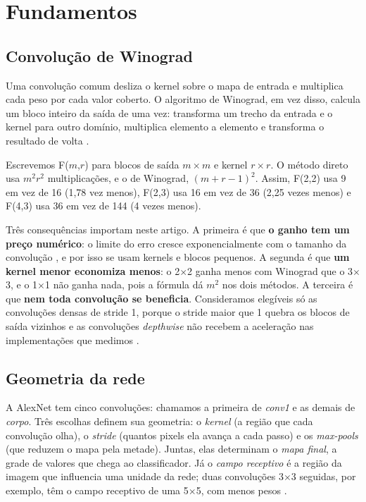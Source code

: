 \documentclass[conference]{IEEEtran}
\newcommand{\by}{\ensuremath{\times}}
\begin{document}
\section{Fundamentos}
\label{sec:fundamentos}

\subsection{Convolução de Winograd}

Uma convolução comum desliza o kernel sobre o mapa de entrada e multiplica cada peso por cada valor coberto. O algoritmo de Winograd,
em vez disso, calcula um bloco inteiro da saída de uma vez: transforma um trecho da entrada e o kernel para outro domínio, multiplica
elemento a elemento e transforma o resultado de volta \cite{lavin2016fast}.

Escrevemos F($m$,$r$) para blocos de saída $m\times m$ e kernel $r\times r$. O método direto usa $m^2r^2$ multiplicações, e o de Winograd,
$(m+r-1)^2$. Assim, F(2,2) usa 9 em vez de 16 (1,78 vez menos), F(2,3) usa 16 em vez de 36 (2,25 vezes menos) e F(4,3) usa 36 em vez de 144
(4 vezes menos).

Três consequências importam neste artigo. A primeira é que \textbf{o ganho tem um preço numérico}: o limite do erro cresce exponencialmente com
o tamanho da convolução \cite{barabasz2020error}, e por isso se usam kernels e blocos pequenos. A segunda é que \textbf{um kernel menor
economiza menos}: o 2\by2 ganha menos com Winograd que o 3\by3, e o 1\by1 não ganha nada, pois a fórmula dá $m^2$ nos dois métodos. A
terceira é que \textbf{nem toda convolução se beneficia}. Consideramos elegíveis só as convoluções densas de stride 1, porque o stride maior
que 1 quebra os blocos de saída vizinhos e as convoluções \textit{depthwise} não recebem a aceleração nas implementações que medimos
\cite{souza2026relatorio}.

\subsection{Geometria da rede}

A AlexNet tem cinco convoluções: chamamos a primeira de \textit{conv1} e as demais de \textit{corpo}. Três escolhas definem sua
geometria: o \textit{kernel} (a região que cada convolução olha), o \textit{stride} (quantos pixels ela avança a cada passo) e os
\textit{max-pools} (que reduzem o mapa pela metade). Juntas, elas determinam o \textit{mapa final}, a grade de valores que chega ao
classificador. Já o \textit{campo receptivo} é a região da imagem que influencia uma unidade da rede; duas convoluções 3\by3 seguidas,
por exemplo, têm o campo receptivo de uma 5\by5, com menos pesos \cite{simonyan2015very}.
\end{document}
